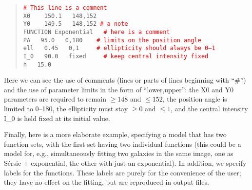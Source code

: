 \documentclass[10pt,a4paper,article]{memoir}
\newcommand{\red}{\textcolor{red}}
\begin{document}
\begin{quote}
  \texttt{\red{\# This line is a comment}}\\
  
  \texttt{X0 ~~   150.1 ~  148,152}\\
  \texttt{Y0 ~~   149.5 ~  148,152         \red{\# a note}}\\
  \texttt{FUNCTION   Exponential  ~ \red{\# here is a comment}}\\
  \texttt{PA  ~  95.0  ~ 0,180   ~~   \red{\# limits on the position angle}}\\
  \texttt{ell  ~  0.45 ~ 0,1     ~~~ \red{\# ellipticity should always be 0--1}}\\
  \texttt{I\_0 ~  90.0 ~  fixed ~~~ \red{\# keep central intensity fixed}}\\
  \texttt{h    ~ 15.0}\\
\end{quote}

Here we can see the use of comments (lines or parts of lines beginning with
``\#'') and the use of parameter limits in the form of ``lower,upper'': the X0
and Y0 parameters are required to remain $\geq 148$ and $\leq 152$, the position
angle is limited to 0--180, the ellipticity must stay $\geq 0$ and $\leq 1$, and
the central intensity I\_0 is held fixed at its initial value.

Finally, here is a more elaborate example, specifying a model that has two
function sets, with the first set having two individual functions (this
could be a model for, e.g., simultaneously fitting two galaxies in the same
image, one as S\'ersic + exponential, the other with just an exponential).
In addition, we specify labels for the functions. These labels are
purely for the convenience of the user; they have no
effect on the fitting, but are reproduced in output files.
\end{document}
